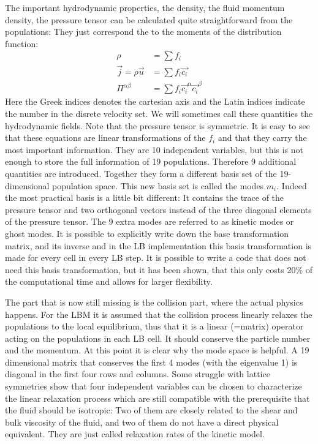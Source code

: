The important hydrodynamic properties, the density, the fluid momentum density,
the pressure tensor can be calculated quite straightforward from
the populations: They just correspond the to the moments
of the distribution function: 
\begin{align}
  \rho &= \sum f_i \\
  \vec{j} = \rho \vec{u} &= \sum f_i \vec{c_i} \\
  \Pi^{\alpha \beta} &= \sum f_i \vec{c_i}^{\alpha}\vec{c_i}^{\beta} 
  \label{eq:fields}
\end{align}
Here the Greek indices denotes the cartesian axis and the
Latin indices indicate the number in the disrete velocity set.
We will sometimes call these quantities the hydrodynamic fields.
Note that the pressure tensor is symmetric.
It is easy to see that these equations are linear transformations
of the $f_i$ and that they carry the most important information. They
are 10 independent variables, but this is not enough to store the
full information of 19 populations. Therefore 9 additional quantities
are introduced. Together they form a different basis set of the
19-dimensional population space. This new basis set is called
the modes $m_i$. Indeed the most practical basis is a little bit different:
It contains the trace of the pressure tensor and two orthogonal 
vectors instead of the three diagonal elements of the pressure 
tensor. The 9 extra modes are referred to as kinetic modes or
ghost modes. It is possible to explicitly write down the 
base transformation matrix, and its inverse and in the \ES{}
LB implementation this basis transformation is made for every
cell in every LB step. It is possible to write a code that does not
need this basis transformation, but it has been shown, that this
only costs 20\% of the computational time and allows for 
larger flexibility.

The part that is now still missing is the collision part, where
the actual physics happens. For the LBM it is assumed that
the collision process linearly relaxes the populations to the local
equilibrium, thus that it is a linear (=matrix) operator 
acting on the populations in each LB cell. It should conserve 
the particle number and the momentum. At this point it is clear
why the mode space is helpful. A 19 dimensional matrix that
conserves the first 4 modes (with the eigenvalue 1) is diagonal in the
first four rows and columns.
Some struggle with lattice symmetries show that four independent
variables can be chosen to characterize the linear relaxation
process which are still compatible with the prerequisite that
the fluid should be isotropic: Two of them are closely related to 
the shear and bulk viscosity of the fluid, and two of them
do not have a direct physical equivalent. They are just called
relaxation rates of the kinetic model.


